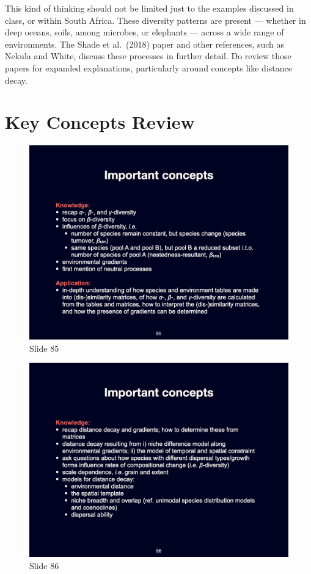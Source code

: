 \documentclass[
  12pt,
]{book}
\begin{document}
This kind of thinking should not be limited just to the examples
discussed in class, or within South Africa. These diversity patterns are
present --- whether in deep oceans, soils, among microbes, or elephants
--- across a wide range of environments. The Shade et al.~(2018) paper
and other references, such as Nekula and White, discuss these processes
in further detail. Do review those papers for expanded explanations,
particularly around concepts like distance decay.

\section{Key Concepts Review}\label{key-concepts-review}

\begin{figure}[ht]
\centering
\includegraphics[width=0.8\linewidth]{../images/BDC334/BDC334-085.jpeg}
\caption*{Slide 85}
\end{figure}

\begin{figure}[ht]
\centering
\includegraphics[width=0.8\linewidth]{../images/BDC334/BDC334-086.jpeg}
\caption*{Slide 86}
\end{figure}
\end{document}
